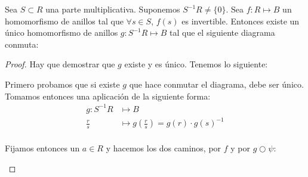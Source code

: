 	\begin{theorem} \label{thm:PropUniversalLoc}
		Sea $S\subset R$ una parte multiplicativa. Suponemos $S^{-1}R \neq \{0\}$. Sea $f:R \longmapsto B$ un homomorfismo de anillos tal que $\forall s \in S$, $f(s)$ es invertible. Entonces existe un único homomorfismo de anillos $g: S^{-1}R \longmapsto B$ tal que el siguiente diagrama conmuta:

		\begin{center}
		
		\end{center}
	\end{theorem}

	\begin{proof}
		Hay que demostrar que $g$ existe y es único. Tenemos lo siguiente:



		Primero probamos que si existe $g$ que hace conmutar el diagrama, debe ser único. Tomamos entonces una aplicación de la siguiente forma:
		\begin{align*}
			g: S^{-1}R & \longmapsto  B\\
			\frac{r}{s} & \longmapsto g\left( \frac{r}{s} \right)=g(r)\cdot g(s)^{-1} \\
		\end{align*}

		Fijamos entonces un $a ∈ R$ y hacemos los dos caminos, por $f$ y por $g○ψ$:

		\begin{center}
\end{center}
\end{proof}

